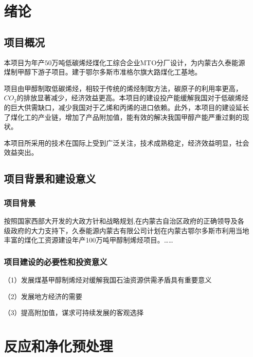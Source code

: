 \documentclass{csuthesis-article}
\begin{document}
%
%
%

\tableofcontents
\newpage

\section{绪论}
\subsection{项目概况}
本项目为年产$50$万吨低碳烯烃煤化工综合企业MTO分厂设计，为内蒙古久泰能源煤制甲醇下游子项目。建于鄂尔多斯市准格尔旗大路煤化工基地。

项目由甲醇制取低碳烯烃，相较于传统的烯烃制取方法，碳原子的利用率更高，$CO_{2}$的排放显著减少，经济效益更高。本项目的建设投产能缓解我国对于低碳烯烃的巨大供需缺口，减少我国对于乙烯和丙烯的进口依赖。此外，本项目的建设延长了煤化工的产业链，增加了产品附加值，能有效的解决我国甲醇产能严重过剩的现状。

本项目所采用的技术在国际上受到广泛关注，技术成熟稳定，经济效益明显，社会效益突出。
\subsection{项目背景和建设意义}
\subsubsection{项目背景}
按照国家西部大开发的大政方针和战略规划,在内蒙古自治区政府的正确领导及各级政府的大力支持下，久泰能源内蒙古有限公司计划在内蒙古鄂尔多斯市利用当地丰富的煤化工资源建设年产100万吨甲醇制烯烃项目。……
\subsubsection{项目建设的必要性和投资意义}
（1）发展煤基甲醇制烯烃对缓解我国石油资源供需矛盾具有重要意义

（2）发展地方经济的需要

（3）提高附加值，谋求可持续发展的客观选择

\newpage
\section{反应和净化预处理}
\end{document}
